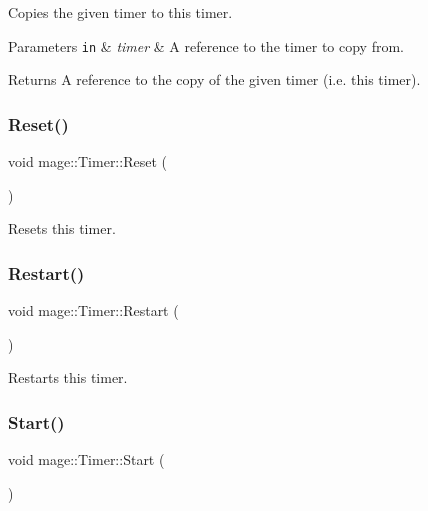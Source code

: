 Copies the given timer to this timer.


\begin{DoxyParams}[1]{Parameters}
\mbox{\tt in}  & {\em timer} & A reference to the timer to copy from. \\
\hline
\end{DoxyParams}
\begin{DoxyReturn}{Returns}
A reference to the copy of the given timer (i.\+e. this timer). 
\end{DoxyReturn}
\hypertarget{classmage_1_1_timer_a0675ff7bc0a8e7343b5a35f865cc9c1a}{}\label{classmage_1_1_timer_a0675ff7bc0a8e7343b5a35f865cc9c1a} 
\subsubsection{\texorpdfstring{Reset()}{Reset()}}
{\footnotesize\ttfamily void mage\+::\+Timer\+::\+Reset (\begin{DoxyParamCaption}{ }\end{DoxyParamCaption})}

Resets this timer. \hypertarget{classmage_1_1_timer_a4e1ba19d02c290a18981db1766f006c3}{}\label{classmage_1_1_timer_a4e1ba19d02c290a18981db1766f006c3} 
\subsubsection{\texorpdfstring{Restart()}{Restart()}}
{\footnotesize\ttfamily void mage\+::\+Timer\+::\+Restart (\begin{DoxyParamCaption}{ }\end{DoxyParamCaption})}

Restarts this timer. \hypertarget{classmage_1_1_timer_a5855c9df8ad1a2b6774942e566833647}{}\label{classmage_1_1_timer_a5855c9df8ad1a2b6774942e566833647} 
\subsubsection{\texorpdfstring{Start()}{Start()}}
{\footnotesize\ttfamily void mage\+::\+Timer\+::\+Start (\begin{DoxyParamCaption}{ }\end{DoxyParamCaption})}

